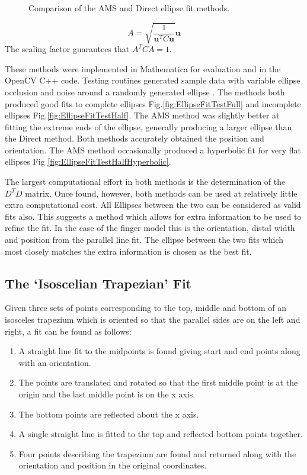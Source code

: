 \begin{figure}[p]
{\label{fig:EllipseFitTestHalf}}
\caption{Comparison of the AMS and Direct ellipse fit methods.}
\label{fig:EllipseFitTest}
\end{figure}

\begin{equation*}
 A = \sqrt{\frac{1}{\mathbf{u}^T C \mathbf{u}}}  \mathbf{u}
\end{equation*}
The scaling factor guarantees that  $A^T C A =1$.

These methods were implemented in Mathematica for evaluation and in the OpenCV C++ code. Testing routines generated sample data with variable ellipse occlusion and noise around a randomly generated ellipse . The methods both produced good fits to complete ellipses Fig.\ref{fig:EllipseFitTestFull} and incomplete ellipses Fig.\ref{fig:EllipseFitTestHalf}. The AMS method was slightly better at fitting the extreme ends of the ellipse, generally producing a larger ellipse than the Direct method. Both methods accurately obtained the position and orientation. The AMS method occasionally produced a hyperbolic fit for very flat ellipses Fig \ref{fig:EllipseFitTestHalfHyperbolic}.


The largest computational effort in both methods is the determination of the $D^T D$ matrix. Once found, however, both methods can be used at relatively little extra computational cost. All Ellipses between the two can be considered as valid fits also. This suggests a method which allows for extra information to be used to refine the fit. In the case of the finger model this is the orientation, distal width and position from the parallel line fit. The ellipse between the two fits which most closely matches the extra information is chosen as the best fit.
\clearpage

\subsection{The `Isoscelian Trapezian' Fit}\label{sec:TrapezianFit}

Given three sets of points corresponding to the top, middle and bottom of an isosceles trapezium which is oriented so that the parallel sides are on the left and right, a fit can be found as follows:

\begin{enumerate}
\item A straight line fit to the midpoints is found giving start and end points along with an orientation.
\item The points are translated and rotated so that the first middle point is at the origin and the last middle point is on the x axis.
\item The bottom points are reflected about the x axis.
\item A single straight line is fitted to the top and reflected bottom points together.
\item Four points describing the trapezium are found and returned along with the orientation and position in the original coordinates.
\end{enumerate}

